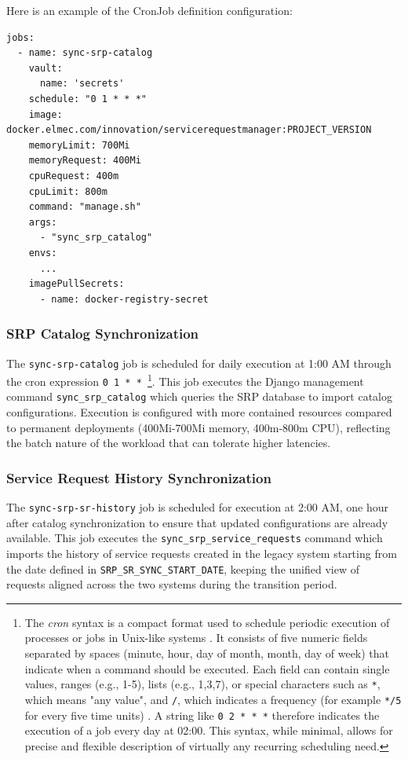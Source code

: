 Here is an example of the CronJob definition configuration:
\begin{verbatim}
jobs:
  - name: sync-srp-catalog
    vault:
      name: 'secrets'
    schedule: "0 1 * * *"
    image: docker.elmec.com/innovation/servicerequestmanager:PROJECT_VERSION
    memoryLimit: 700Mi
    memoryRequest: 400Mi
    cpuRequest: 400m
    cpuLimit: 800m
    command: "manage.sh"
    args:
      - "sync_srp_catalog"
    envs:
      ...
    imagePullSecrets:
      - name: docker-registry-secret
\end{verbatim}

\subsubsection{SRP Catalog Synchronization}
The \texttt{sync-srp-catalog} job is scheduled for daily execution at 1:00 AM through the cron expression \texttt{0 1 * * }\footnote{The \textit{cron} syntax is a compact format used to schedule periodic execution of processes or jobs in Unix-like systems \cite{cron}. It consists of five numeric fields separated by spaces (minute, hour, day of month, month, day of week) that indicate when a command should be executed. Each field can contain single values, ranges (e.g., 1-5), lists (e.g., 1,3,7), or special characters such as \texttt{*}, which means "any value", and \texttt{/}, which indicates a frequency (for example \texttt{*/5} for every five time units) \cite{cron}. A string like \texttt{0 2 * * *} therefore indicates the execution of a job every day at 02:00. This syntax, while minimal, allows for precise and flexible description of virtually any recurring scheduling need.}. This job executes the Django management command \texttt{sync\_srp\_catalog} which queries the SRP database to import catalog configurations. Execution is configured with more contained resources compared to permanent deployments (400Mi-700Mi memory, 400m-800m CPU), reflecting the batch nature of the workload that can tolerate higher latencies.


\subsubsection{Service Request History Synchronization}

The \texttt{sync-srp-sr-history} job is scheduled for execution at 2:00 AM, one hour after catalog synchronization to ensure that updated configurations are already available. This job executes the \texttt{sync\_srp\_service\_requests} command which imports the history of service requests created in the legacy system starting from the date defined in \texttt{SRP\_SR\_SYNC\_START\_DATE}, keeping the unified view of requests aligned across the two systems during the transition period.

